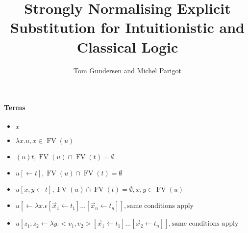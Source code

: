 \documentclass[a4paper]{article}
\begin{document}
\title{Strongly Normalising Explicit Substitution for Intuitionistic and Classical Logic}

\author{Tom Gundersen and Michel Parigot}

\maketitle
% 
% 
% 

\newcommand{\FV}{\mathop{FV}}

\paragraph{Terms}
\begin{itemize}
 \item $x$
 \item $\lambda x.u, x\in\FV(u)$
 \item $(u)t, \FV(u)\cap\FV(t)=\emptyset$
 \item $u[\leftarrow t], \FV(u)\cap\FV(t)=\emptyset$
 \item $u[x,y\leftarrow t], \FV(u)\cap\FV(t)=\emptyset, x,y\in\FV(u)$
 \item $u[\leftarrow \lambda x.\epsilon[\vec x_1\leftarrow t_1]\dots[\vec x_n\leftarrow t_n]], \mbox{same conditions apply}$
 \item $u[z_1,z_2\leftarrow \lambda y.<v_1,v_2>[\vec x_1\leftarrow t_1]\dots[\vec x_2\leftarrow t_n]], \mbox{same conditions apply}$
\end{itemize}
\end{document}
